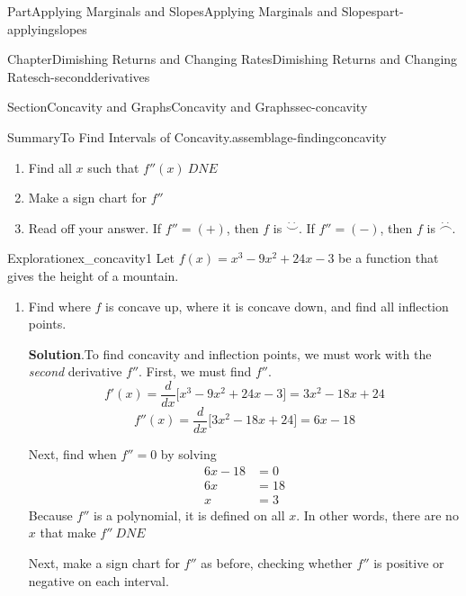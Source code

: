 \documentclass[oneside,10pt,]{tufte-book}
\newcommand{\blocktitlefont}{\relax}
\numberwithin{equation}{chapter}
\newcommand{\ddx}[1]{ \dfrac{d}{dx} \Big[ #1 \Big]  }
\newcommand{\amp}{&}
\begin{document}
\begin{partptx}{Part}{Applying Marginals and Slopes}{}{Applying Marginals and Slopes}{}{}{part-applyingslopes}
\begin{chapterptx}{Chapter}{Dimishing Returns and Changing Rates}{}{Dimishing Returns and Changing Rates}{}{}{ch-secondderivatives}
\begin{sectionptx}{Section}{Concavity and Graphs}{}{Concavity and Graphs}{}{}{sec-concavity}
\begin{assemblage}{Summary}{To Find Intervals of Concavity.}{assemblage-findingconcavity}
\begin{enumerate}
\item{}Find all \(x\) such that \(f''(x)\ DNE\)%
\item{}Make a sign chart for \(f''\)%
\item{}Read off your answer.  If \(f''=(+)\), then \(f\) is \(\stackrel{\cdot\,\cdot}{\smile}\).  If \(f''=(-)\), then \(f\) is \(\stackrel{\cdot\,\cdot}{\frown}\).%
\end{enumerate}
%
\end{assemblage}
\begin{exploration}{Exploration}{}{ex_concavity1}%
Let \(f(x) = x^3 - 9x^2 + 24x - 3 \) be a function that gives the height of a mountain.%
\begin{enumerate}[font=\bfseries,label=(\alph*),ref=\alph*]%
\item{}Find where \(f\) is concave up, where it is concave down, and find all inflection points.%
\par\smallskip%
\noindent\textbf{\blocktitlefont Solution}.\hypertarget{ex_concavity1-2-2}{}\quad{}To find concavity and inflection points, we must work with the \emph{second} derivative \(f''\). First, we must find \(f''\).%
\begin{equation*}
f'(x) = \ddx{x^3 - 9x^2 + 24x - 3 } = 3x^2 -18x +24
\end{equation*}
%
\begin{equation*}
f''(x) = \ddx{3x^2 -18x +24} = 6x - 18
\end{equation*}
%
\par
Next, find when \(f''=0\) by solving%
\begin{align*}
6x-18 \amp =0\\
6x    \amp =18\\
x 	\amp =3
\end{align*}
Because \(f''\) is a polynomial, it is defined on all \(x\).  In other words, there are no \(x\) that make \(f''\ DNE\)%
\par
Next, make a sign chart for \(f''\) as before, checking whether  \(f''\) is positive or negative on each interval. \begin{image}{0.25}{0.5}{0.25}{}%
\end{image}
\end{enumerate}
\end{exploration}
\end{sectionptx}
\end{chapterptx}
\end{partptx}
\end{document}
